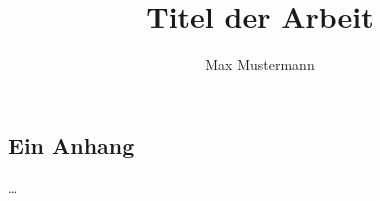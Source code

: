 \documentclass[
		master, %
		german, %
		vlba, %
		nomencl, %
		hyperref,
	]{mrcc}
\author{Max Mustermann}
\title{Titel der Arbeit}
\begin{document}
	
	
	\renewcommand{\chaptermark}[1]{\markboth{\textsc{\thechapter.\ #1}}{}} %
	\begin{appendix}
		\chapter{Ein Anhang}
		\dots{}
	\end{appendix}
\end{document}
